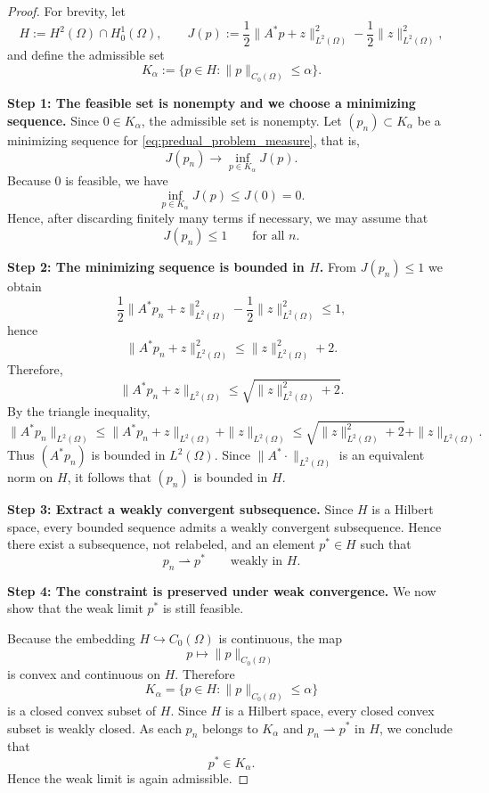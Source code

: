 \documentclass[11pt,a4paper]{article}
\begin{document}
\begin{proof}
For brevity, let
\[
H := H^2(\Omega)\cap H_0^1(\Omega),
\qquad
J(p) := \frac12\|A^*p+z\|_{L^2(\Omega)}^2-\frac12\|z\|_{L^2(\Omega)}^2,
\]
and define the admissible set
\[
K_\alpha := \{p\in H : \|p\|_{C_0(\Omega)}\le \alpha\}.
\]

\medskip
\noindent\textbf{Step 1: The feasible set is nonempty and we choose a minimizing sequence.}
Since $0\in K_\alpha$, the admissible set is nonempty. Let $(p_n)\subset K_\alpha$ be a minimizing sequence for \eqref{eq:predual_problem_measure}, that is,
\[
J(p_n)\to \inf_{p\in K_\alpha} J(p).
\]
Because $0$ is feasible, we have
\[
\inf_{p\in K_\alpha} J(p)\le J(0)=0.
\]
Hence, after discarding finitely many terms if necessary, we may assume that
\[
J(p_n)\le 1
\qquad\text{for all }n.
\]

\medskip
\noindent\textbf{Step 2: The minimizing sequence is bounded in $H$.}
From $J(p_n)\le 1$ we obtain
\[
\frac12\|A^*p_n+z\|_{L^2(\Omega)}^2-\frac12\|z\|_{L^2(\Omega)}^2 \le 1,
\]
hence
\[
\|A^*p_n+z\|_{L^2(\Omega)}^2 \le \|z\|_{L^2(\Omega)}^2 + 2.
\]
Therefore,
\[
\|A^*p_n+z\|_{L^2(\Omega)}
\le \sqrt{\|z\|_{L^2(\Omega)}^2+2}.
\]
By the triangle inequality,
\[
\|A^*p_n\|_{L^2(\Omega)}
\le \|A^*p_n+z\|_{L^2(\Omega)} + \|z\|_{L^2(\Omega)}
\le \sqrt{\|z\|_{L^2(\Omega)}^2+2} + \|z\|_{L^2(\Omega)}.
\]
Thus $(A^*p_n)$ is bounded in $L^2(\Omega)$. Since $\|A^*\cdot\|_{L^2(\Omega)}$ is an equivalent norm on $H$, it follows that $(p_n)$ is bounded in $H$.

\medskip
\noindent\textbf{Step 3: Extract a weakly convergent subsequence.}
Since $H$ is a Hilbert space, every bounded sequence admits a weakly convergent subsequence. Hence there exist a subsequence, not relabeled, and an element $p^*\in H$ such that
\[
p_n \rightharpoonup p^*
\qquad\text{weakly in }H.
\]

\medskip
\noindent\textbf{Step 4: The constraint is preserved under weak convergence.}
We now show that the weak limit $p^*$ is still feasible.

Because the embedding $H\hookrightarrow C_0(\Omega)$ is continuous, the map
\[
p\mapsto \|p\|_{C_0(\Omega)}
\]
is convex and continuous on $H$. Therefore
\[
K_\alpha=\{p\in H:\|p\|_{C_0(\Omega)}\le \alpha\}
\]
is a closed convex subset of $H$. Since $H$ is a Hilbert space, every closed convex subset is weakly closed. As each $p_n$ belongs to $K_\alpha$ and $p_n\rightharpoonup p^*$ in $H$, we conclude that
\[
p^*\in K_\alpha.
\]
Hence the weak limit is again admissible.


\end{proof}
\end{document}
